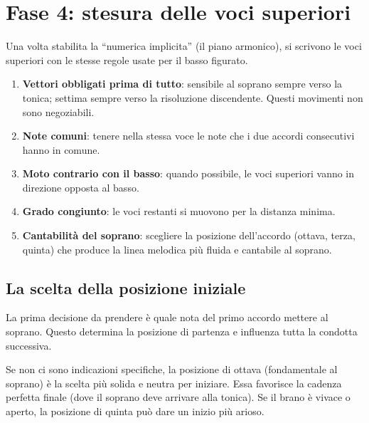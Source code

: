 \section{Fase 4: stesura delle voci superiori}
\label{sec:fase4_basso}

Una volta stabilita la ``numerica implicita'' (il piano armonico), si scrivono le voci superiori con le stesse regole usate per il basso figurato.

\begin{regola}
	\label{reg:priorita_stesura}
	\begin{enumerate}
		\item \textbf{Vettori obbligati prima di tutto}: sensibile al soprano sempre verso la tonica; settima sempre verso la risoluzione discendente. Questi movimenti non sono negoziabili.
		\item \textbf{Note comuni}: tenere nella stessa voce le note che i due accordi consecutivi hanno in comune.
		\item \textbf{Moto contrario con il basso}: quando possibile, le voci superiori vanno in direzione opposta al basso.
		\item \textbf{Grado congiunto}: le voci restanti si muovono per la distanza minima.
		\item \textbf{Cantabilità del soprano}: scegliere la posizione dell'accordo (ottava, terza, quinta) che produce la linea melodica più fluida e cantabile al soprano.
	\end{enumerate}
\end{regola}

\subsection{La scelta della posizione iniziale}

La prima decisione da prendere è quale nota del primo accordo mettere al soprano. Questo determina la posizione di partenza e influenza tutta la condotta successiva.

\begin{regola}
	\label{reg:posizione_iniziale}
	Se non ci sono indicazioni specifiche, la posizione di ottava (fondamentale al soprano) è la scelta più solida e neutra per iniziare. Essa favorisce la cadenza perfetta finale (dove il soprano deve arrivare alla tonica). Se il brano è vivace o aperto, la posizione di quinta può dare un inizio più arioso.
\end{regola}

